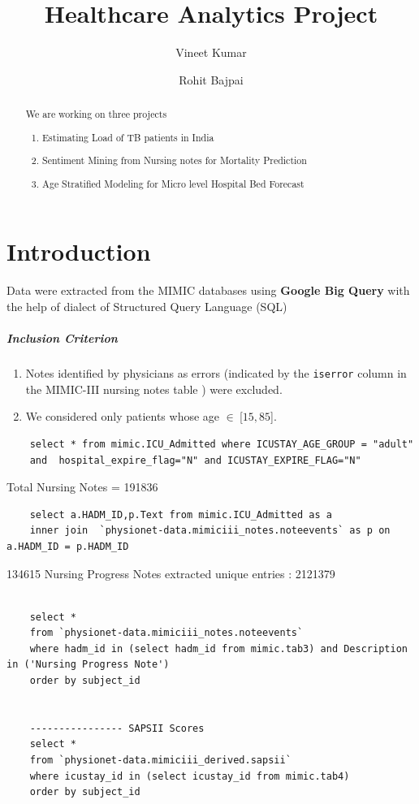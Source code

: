 \documentclass[10pt,a4paper]{report}
\title{Healthcare Analytics Project}
\author{Vineet Kumar \and Rohit Bajpai}
\begin{document}
	\maketitle
	\begin{abstract}
		We are working on three projects
		\begin{enumerate}
			\item Estimating Load of TB patients in India
			\item Sentiment Mining from Nursing notes for Mortality Prediction
			\item Age Stratified Modeling for Micro level Hospital Bed Forecast
		\end{enumerate}
	\end{abstract}
	\tableofcontents
	\chapter{Introduction}
	
	Data were extracted from the MIMIC databases using
	\textbf{Google Big Query} with the help of dialect of Structured Query Language (SQL)
	
	\paragraph{Inclusion Criterion}
	\begin{enumerate}
		\item Notes identified by physicians as errors (indicated by the \texttt{iserror} column in the MIMIC-III
		nursing notes table ) were excluded.
		\item We considered only patients whose age $\in ~ $[$15,85 $].
	\end{enumerate}

	\begin{verbatim}
	select * from mimic.ICU_Admitted where ICUSTAY_AGE_GROUP = "adult" 
	and  hospital_expire_flag="N" and ICUSTAY_EXPIRE_FLAG="N"
	\end{verbatim}
	
	Total Nursing Notes = 191836
	
	\begin{verbatim}
	select a.HADM_ID,p.Text from mimic.ICU_Admitted as a
	inner join  `physionet-data.mimiciii_notes.noteevents` as p on a.HADM_ID = p.HADM_ID
	\end{verbatim}
	134615 Nursing Progress Notes extracted
	unique entries : 2121379
	
	\begin{verbatim}
	
	select * 
	from `physionet-data.mimiciii_notes.noteevents` 
	where hadm_id in (select hadm_id from mimic.tab3) and Description in ('Nursing Progress Note')
	order by subject_id
	
	
	---------------- SAPSII Scores
	select * 
	from `physionet-data.mimiciii_derived.sapsii` 
	where icustay_id in (select icustay_id from mimic.tab4)
	order by subject_id
	\end{verbatim}
	
\end{document}
